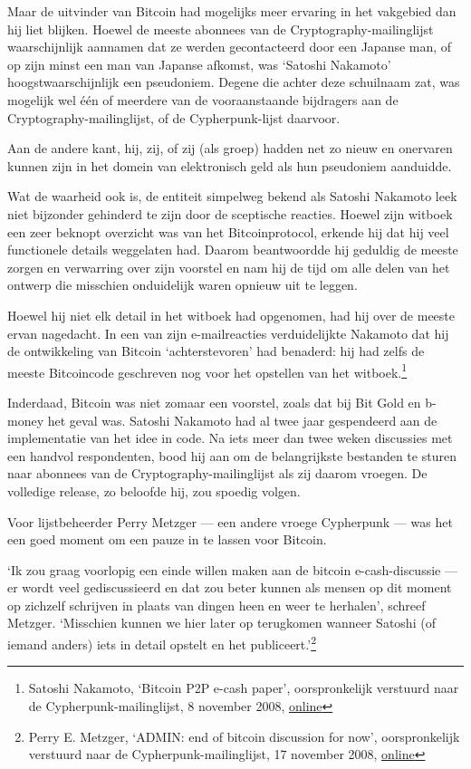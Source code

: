 \documentclass[
  a5paper,
  smalldemyvopaper,11pt,twoside,onecolumn,openright,extrafontsizes]{memoir}
\begin{document}
Maar de uitvinder van Bitcoin had mogelijks meer ervaring in het
vakgebied dan hij liet blijken. Hoewel de meeste abonnees van de
Cryptography-mailinglijst waarschijnlijk aannamen dat ze werden
gecontacteerd door een Japanse man, of op zijn minst een man van Japanse
afkomst, was `Satoshi Nakamoto' hoogstwaarschijnlijk een pseudoniem.
Degene die achter deze schuilnaam zat, was mogelijk wel één of meerdere
van de vooraanstaande bijdragers aan de Cryptography-mailinglijst, of de
Cypherpunk-lijst daarvoor.

Aan de andere kant, hij, zij, of zij (als groep) hadden net zo nieuw en
onervaren kunnen zijn in het domein van elektronisch geld als hun
pseudoniem aanduidde.

Wat de waarheid ook is, de entiteit simpelweg bekend als Satoshi
Nakamoto leek niet bijzonder gehinderd te zijn door de sceptische
reacties. Hoewel zijn witboek een zeer beknopt overzicht was van het
Bitcoinprotocol, erkende hij dat hij veel functionele details weggelaten
had. Daarom beantwoordde hij geduldig de meeste zorgen en verwarring
over zijn voorstel en nam hij de tijd om alle delen van het ontwerp die
misschien onduidelijk waren opnieuw uit te leggen.

Hoewel hij niet elk detail in het witboek had opgenomen, had hij over de
meeste ervan nagedacht. In een van zijn e-mailreacties verduidelijkte
Nakamoto dat hij de ontwikkeling van Bitcoin `achterstevoren' had
benaderd: hij had zelfs de meeste Bitcoincode geschreven nog voor het
opstellen van het witboek.\footnote{Satoshi Nakamoto, `Bitcoin P2P
  e-cash paper', oorspronkelijk verstuurd naar de
  Cypherpunk-mailinglijst, 8 november 2008,
  \href{https://www.metzdowd.com/pipermail/cryptography/2008-November/014832.html}{online}}

Inderdaad, Bitcoin was niet zomaar een voorstel, zoals dat bij Bit Gold
en b-money het geval was. Satoshi Nakamoto had al twee jaar gespendeerd
aan de implementatie van het idee in code. Na iets meer dan twee weken
discussies met een handvol respondenten, bood hij aan om de
belangrijkste bestanden te sturen naar abonnees van de
Cryptography-mailinglijst als zij daarom vroegen. De volledige release,
zo beloofde hij, zou spoedig volgen.

Voor lijstbeheerder Perry Metzger --- een andere vroege Cypherpunk ---
was het een goed moment om een pauze in te lassen voor Bitcoin.

`Ik zou graag voorlopig een einde willen maken aan de bitcoin
e-cash-discussie --- er wordt veel gediscussieerd en dat zou beter
kunnen als mensen op dit moment op zichzelf schrijven in plaats van
dingen heen en weer te herhalen', schreef Metzger. `Misschien kunnen we
hier later op terugkomen wanneer Satoshi (of iemand anders) iets in
detail opstelt en het publiceert.'\footnote{Perry E. Metzger, `ADMIN:
  end of bitcoin discussion for now', oorspronkelijk verstuurd naar de
  Cypherpunk-mailinglijst, 17 november 2008,
  \href{https://www.metzdowd.com/pipermail/cryptography/2008-November/014867.html}{online}}
\end{document}
